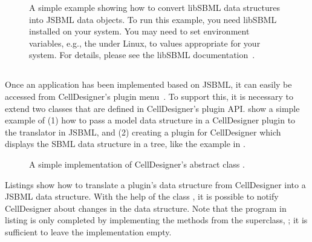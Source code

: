 \begin{figure}[htb]
  \caption{A simple example showing how to convert libSBML data structures
    into JSBML data objects.  To run this example, you need libSBML
    installed on your system.  You may need to set environment variables,
    e.g., the 
    under Linux, to values appropriate for your
    system. For details, please see the libSBML
    documentation~\cite{libSBMLwebsite}.}
  \label{lst:LibSBMLio}
\end{figure}


\subsection{}

Once an application has been implemented based on JSBML, it can easily be
accessed from CellDesigner's plugin menu~\citep{Funahashi2003}. To support
this, it is necessary to extend two classes that are defined in
CellDesigner's plugin API. 
show a simple example of (1) how to pass a model
data structure in a CellDesigner plugin to the translator in JSBML, and (2)
creating a plugin for CellDesigner which displays the SBML data structure
in a tree, like the example in .

\begin{figure}[bht]
  \vspace*{-1ex}
  \caption{A simple implementation of CellDesigner's abstract class .}
  \label{lst:PluginAction}
\end{figure}

Listings  show how to translate a
plugin's data structure from CellDesigner into a JSBML data structure. With
the help of the class \PluginSBMLWriter, it is possible to notify
CellDesigner about changes in the data structure. Note that the program in
listing  is only completed by implementing the methods from the
superclass, ; it is sufficient to leave the
implementation empty.

